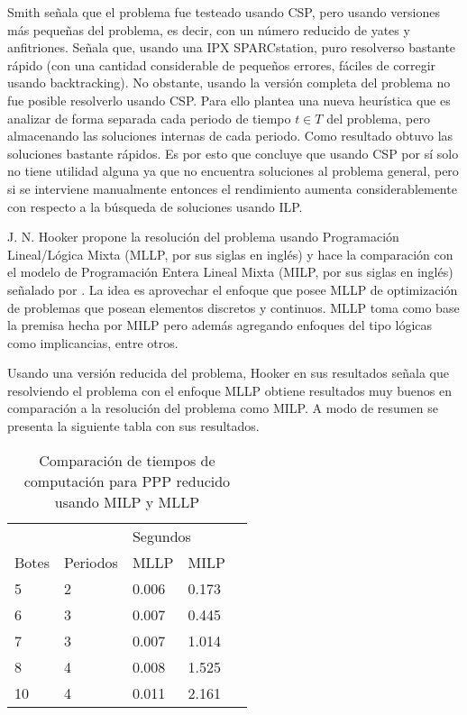 \documentclass[letter, 10pt]{article}
\begin{document}
Smith\cite{Smith1996} señala que el problema fue testeado usando CSP, pero usando versiones más pequeñas del problema, es decir, con un número reducido de yates y anfitriones. Señala que, usando una IPX SPARCstation, puro resolverso bastante rápido (con una cantidad considerable de pequeños errores, fáciles de corregir usando backtracking). No obstante, usando la versión completa del problema no fue posible resolverlo usando CSP. Para ello plantea una nueva heurística que es analizar de forma separada cada periodo de tiempo $t\in T$ del problema, pero almacenando las soluciones internas de cada periodo. Como resultado obtuvo las soluciones bastante rápidos. Es por esto que concluye que usando CSP por sí solo no tiene utilidad alguna ya que no encuentra soluciones al problema general, pero si se interviene manualmente entonces el rendimiento aumenta considerablemente con respecto a la búsqueda de soluciones usando ILP.

J. N. Hooker\cite{Hooker1999395} propone la resolución del problema usando Programación Lineal/Lógica Mixta (MLLP, por sus siglas en inglés) y hace la comparación con el modelo de Programación Entera Lineal Mixta (MILP, por sus siglas en inglés) señalado por \cite{Kalvelagen20031713}. La idea es aprovechar el enfoque que posee MLLP de optimización de problemas que posean elementos discretos y continuos. MLLP toma como base la premisa hecha por MILP pero además agregando enfoques del tipo lógicas como implicancias, entre otros.

Usando una versión reducida del problema, Hooker en sus resultados señala que resolviendo el problema con el enfoque MLLP obtiene resultados muy buenos en comparación a la resolución del problema como MILP. A modo de resumen se presenta la siguiente tabla con sus resultados\cite{Hooker1999395}.

\begin{table}[H]
\centering
\begin{tabular}{|l|l|l|l|l}
\cline{1-4}
\multicolumn{2}{|l|}{}        & \multicolumn{2}{l|}{Segundos}  &  \\ \cline{1-4}
Botes         & Periodos      & MLLP    & MILP                 &  \\ \cline{1-4}
5             & 2             & 0.006   & 0.173                &  \\ \cline{1-4}
6 & 3 & 0.007 & 0.445 &  \\ \cline{1-4}
7             & 3             & 0.007   & 1.014                &  \\ \cline{1-4}
8             & 4             & 0.008   & 1.525                &  \\ \cline{1-4}
10            & 4             & 0.011   & 2.161                &  \\ \cline{1-4}
\end{tabular}
\caption{Comparación de tiempos de computación para PPP reducido usando MILP y MLLP}
\end{table}
\end{document}
